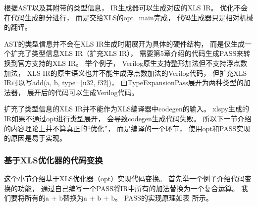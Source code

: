 根据AST以及其附带的类型信息，
IR生成器可以生成对应的XLS IR。
优化不会在代码生成部分进行，
而是交给XLS的opt\_main完成，
代码生成器只是相对机械的翻译。

AST的类型信息并不会在XLS IR生成时期展开为具体的硬件结构，
而是仅生成一个扩充了类型信息XLS IR（扩充XLS IR），
需要第5章介绍的代码生成PASS来转换到官方支持的XLS IR。
举个例子，
Verilog原生支持整形加法但不支持浮点数加法，
XLS IR的原生语义也并不能生成浮点数加法的Verilog代码，
但扩充XLS IR可以写add(a, b, type=[u32, f32])，
由TypeExpansionPass展开为两种类型的加法器，
展开后的代码可以生成Verilog代码。

扩充了类型信息的XLS IR并不能作为XLS编译器中codegen的输入。
xlspy生成的IR如果不通过opt进行类型展开，
会导致codegen生成代码失败。
所以下一节介绍的内容理论上并不算真正的“优化”，
而是编译的一个环节，
使用opt和PASS实现的原因是易于实现。

\subsubsection{基于XLS优化器的代码变换}

这个小节介绍基于XLS优化器（opt）实现代码变换。
首先举一个例子介绍代码变换的功能，
通过自己编写一个PASS将IR中所有的加法替换为一个复合运算。
我们要将所有的a + b替换为a + b + b。
PASS的实现原理如表  所示。